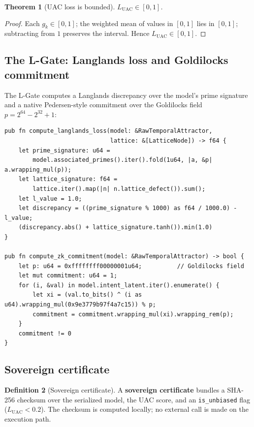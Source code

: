 \documentclass[11pt]{article}
\newtheorem{theorem}{Theorem}[section]
\theoremstyle{definition}
\newtheorem{definition}[theorem]{Definition}
\begin{document}
\begin{theorem}[UAC loss is bounded]
\label{thm:uac-bounded}
  $L_{\mathrm{UAC}} \in [0, 1]$.
\end{theorem}

\begin{proof}
  Each $g_k \in [0,1]$; the weighted mean of values in $[0,1]$ lies in
  $[0,1]$; subtracting from $1$ preserves the interval. Hence
  $L_{\mathrm{UAC}} \in [0,1]$.
\end{proof}

\subsection{The L-Gate: Langlands loss and Goldilocks commitment}

The L-Gate computes a Langlands discrepancy over the model's prime signature
and a native Pedersen-style commitment over the Goldilocks field
$p = 2^{64} - 2^{32} + 1$:

\begin{lstlisting}[language=rustL]
pub fn compute_langlands_loss(model: &RawTemporalAttractor,
                              lattice: &[LatticeNode]) -> f64 {
    let prime_signature: u64 =
        model.associated_primes().iter().fold(1u64, |a, &p| a.wrapping_mul(p));
    let lattice_signature: f64 =
        lattice.iter().map(|n| n.lattice_defect()).sum();
    let l_value = 1.0;
    let discrepancy = ((prime_signature % 1000) as f64 / 1000.0) - l_value;
    (discrepancy.abs() + lattice_signature.tanh()).min(1.0)
}

pub fn compute_zk_commitment(model: &RawTemporalAttractor) -> bool {
    let p: u64 = 0xffffffff00000001u64;          // Goldilocks field
    let mut commitment: u64 = 1;
    for (i, &val) in model.intent_latent.iter().enumerate() {
        let xi = (val.to_bits() ^ (i as u64).wrapping_mul(0x9e3779b97f4a7c15)) % p;
        commitment = commitment.wrapping_mul(xi).wrapping_rem(p);
    }
    commitment != 0
}
\end{lstlisting}

\subsection{Sovereign certificate}

\begin{definition}[Sovereign certificate]
  A \textbf{sovereign certificate} bundles a SHA-256 checksum over the
  serialized model, the UAC score, and an \texttt{is\_unbiased} flag
  ($L_{\mathrm{UAC}} < 0.2$). The checksum is computed locally; no external
  call is made on the execution path.
\end{definition}
\end{document}
